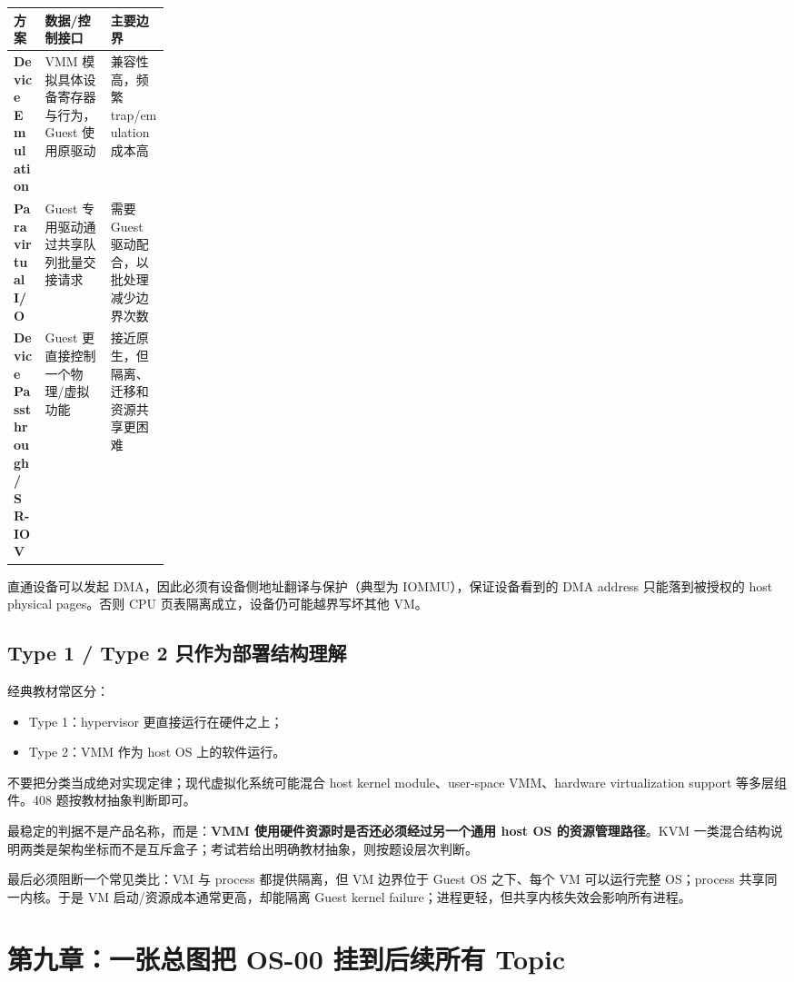 \documentclass[11pt,a4paper]{ctexart}
\newcommand{\kw}[1]{\textbf{#1}}
\begin{document}
\begin{center}
\small
\renewcommand{\arraystretch}{1.25}
\begin{tabularx}{\linewidth}{>{\bfseries}p{0.2\linewidth} X X}
\toprule
方案 & 数据/控制接口 & 主要边界\\
\midrule
Device Emulation & VMM 模拟具体设备寄存器与行为，Guest 使用原驱动 & 兼容性高，频繁 trap/emulation 成本高\\
Paravirtual I/O & Guest 专用驱动通过共享队列批量交接请求 & 需要 Guest 驱动配合，以批处理减少边界次数\\
Device Passthrough / SR-IOV & Guest 更直接控制一个物理/虚拟功能 & 接近原生，但隔离、迁移和资源共享更困难\\
\bottomrule
\end{tabularx}
\end{center}

直通设备可以发起 DMA，因此必须有设备侧地址翻译与保护（典型为 IOMMU），保证设备看到的 DMA address 只能落到被授权的 host physical pages。否则 CPU 页表隔离成立，设备仍可能越界写坏其他 VM。

\subsection{Type 1 / Type 2 只作为部署结构理解}

经典教材常区分：
\begin{itemize}
  \item Type 1：hypervisor 更直接运行在硬件之上；
  \item Type 2：VMM 作为 host OS 上的软件运行。
\end{itemize}

不要把分类当成绝对实现定律；现代虚拟化系统可能混合 host kernel module、user-space VMM、hardware virtualization support 等多层组件。408 题按教材抽象判断即可。

最稳定的判据不是产品名称，而是：\kw{VMM 使用硬件资源时是否还必须经过另一个通用 host OS 的资源管理路径}。KVM 一类混合结构说明两类是架构坐标而不是互斥盒子；考试若给出明确教材抽象，则按题设层次判断。

最后必须阻断一个常见类比：VM 与 process 都提供隔离，但 VM 边界位于 Guest OS 之下、每个 VM 可以运行完整 OS；process 共享同一内核。于是 VM 启动/资源成本通常更高，却能隔离 Guest kernel failure；进程更轻，但共享内核失效会影响所有进程。

\section{第九章：一张总图把 OS-00 挂到后续所有 Topic}
\end{document}
